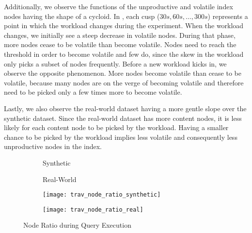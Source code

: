 \documentclass[abstracton,12pt]{scrartcl}
\theoremstyle{definition}
\begin{document}

Additionally, we observe the functions of the unproductive and volatile index
nodes having the shape of a cycloid. In , each
cusp ($30 s, 60 s, \dots, 300 s$) represents a point in which the workload
changes during the experiment. When the workload changes, we initially see a
steep decrease in volatile nodes. During that phase, more nodes cease to be
volatile than become volatile. Nodes need to reach the threshold in order to
become volatile and few do, since the skew in the workload only picks a subset of
nodes frequently. Before a new workload kicks in, we observe the opposite
phenomenon. More nodes become volatile than cease to be volatile, because many nodes are
on the verge of becoming volatile and therefore need to be picked only a few
times more to
become volatile. 

Lastly, we also observe the real-world dataset having a more gentle slope over
the synthetic dataset. Since
the real-world dataset has more content nodes, it is less likely for each
content node to be picked by the workload. Having a smaller chance to be
picked by the workload implies less volatile and consequently less
unproductive nodes in the index.  

\begin{figure}[ht]
  \centering
  \begin{subfigure}{0.49\linewidth}
    \centering
    Synthetic
  \end{subfigure}
  \begin{subfigure}{0.49\linewidth}
    \centering
    Real-World
  \end{subfigure}
  \begin{subfigure}{0.49\linewidth}
    \centering
    \texttt{[image: trav\_node\_ratio\_synthetic]}
    \caption{}
    \label{fig:trav_node_ratio_synthetic}
  \end{subfigure}
  \begin{subfigure}{0.49\linewidth}
    \centering
    \texttt{[image: trav\_node\_ratio\_real]}
    \caption{}
    \label{fig:trav_node_ratio_real}
  \end{subfigure}
  \caption{Node Ratio during Query Execution}
  \label{fig:trav_node_ratio}
\end{figure}
\end{document}
